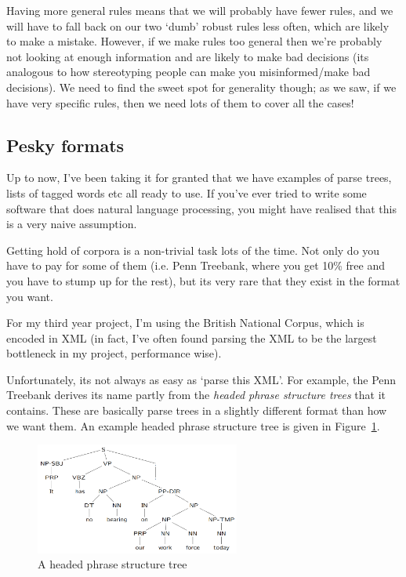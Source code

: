 Having more general rules means that we will probably have fewer rules, and we
will have to fall back on our two `dumb' robust rules less often, which are
likely to make a mistake. However, if we make rules too general then we're
probably not looking at enough information and are likely to make bad decisions
(its analogous to how stereotyping people can make you misinformed/make bad
decisions). We need to find the sweet spot for generality though; as we saw, if
we have very specific rules, then we need lots of them to cover all the cases!

\subsection{Pesky formats}

Up to now, I've been taking it for granted that we have examples of parse trees,
lists of tagged words etc all ready to use. If you've ever tried to write some
software that does natural language processing, you might have realised that
this is a very naive assumption.

Getting hold of corpora is a non-trivial task lots of the time. Not only do you
have to pay for some of them (i.e. Penn Treebank, where you get 10\% free and
you have to stump up for the rest), but its very rare that they exist in the
format you want.

For my third year project, I'm using the British National Corpus, which is
encoded in XML (in fact, I've often found parsing the XML to be the largest
bottleneck in my project, performance wise).

Unfortunately, its not always as easy as `parse this XML'. For example, the Penn
Treebank derives its name partly from the \textit{headed phrase structure trees}
that it contains. These are basically parse trees in a slightly different format
than how we want them. An example headed phrase structure tree is given in
Figure~\ref{fig:headed-phrase-struct-tree}.

\begin{figure}[h]
  \centering
  \includegraphics[width=0.6\textwidth]{images/headed-phrase-struct}
  \caption{A headed phrase structure tree}
  \label{fig:headed-phrase-struct-tree}
\end{figure}

